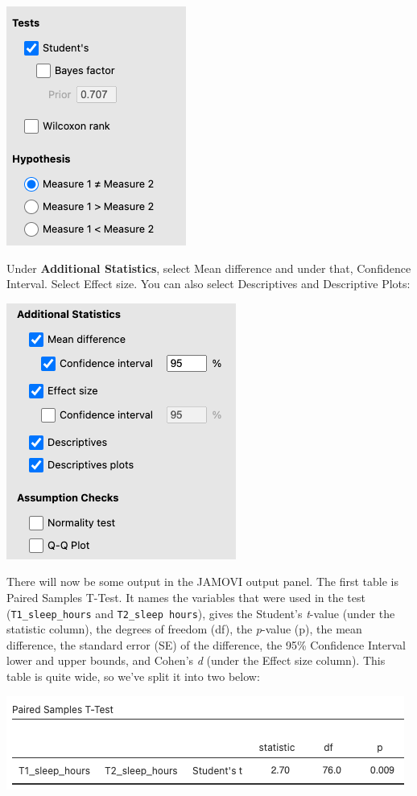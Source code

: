 \documentclass[
]{book}
\begin{document}
\includegraphics{img/paired_ttest_params1.png}

Under \textbf{Additional Statistics}, select Mean difference and under that, Confidence Interval. Select Effect size. You can also select Descriptives and Descriptive Plots:

\includegraphics{img/paired_ttest_params2.png}

There will now be some output in the JAMOVI output panel. The first table is Paired Samples T-Test. It names the variables that were used in the test (\texttt{T1\_sleep\_hours} and \texttt{T2\_sleep\ hours}), gives the Student's \emph{t}-value (under the statistic column), the degrees of freedom (df), the \emph{p}-value (p), the mean difference, the standard error (SE) of the difference, the 95\% Confidence Interval lower and upper bounds, and Cohen's \emph{d} (under the Effect size column). This table is quite wide, so we've split it into two below:

\includegraphics{img/pairedttestoutput_1.png}
\end{document}
